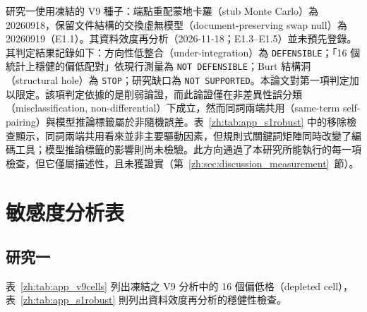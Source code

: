 研究一使用凍結的 V9 種子：端點重配蒙地卡羅（stub Monte Carlo）為 20260918，保留文件結構的交換虛無模型（document-preserving swap null）為 20260919（E1.1）。其資料效度再分析（2026-11-18；E1.3--E1.5）並未預先登錄。其判定結果記錄如下：方向性低整合（under-integration）為 \texttt{DEFENSIBLE}；「16 個統計上穩健的偏低配對」依現行測量為 \texttt{NOT DEFENSIBLE}；Burt 結構洞（structural hole）為 \texttt{STOP}；研究缺口為 \texttt{NOT SUPPORTED}。本論文對第一項判定加以限定。該項判定依據的是削弱論證，而此論證僅在非差異性誤分類（misclassification, non-differential）下成立，然而同詞兩端共用（same-term self-pairing）與模型推論標籤屬於非隨機誤差。表~\ref{zh:tab:app_s1robust} 中的移除檢查顯示，同詞兩端共用看來並非主要驅動因素，但規則式關鍵詞矩陣同時改變了編碼工具；模型推論標籤的影響則尚未檢驗。此方向通過了本研究所能執行的每一項檢查，但它僅屬描述性，且未獲證實（第~\ref{zh:sec:discussion_measurement}~節）。

\chapter{敏感度分析表}
\label{zh:app:sens}

\section{研究一}

表~\ref{zh:tab:app_v9cells} 列出凍結之 V9 分析中的 16 個偏低格（depleted cell），表~\ref{zh:tab:app_s1robust} 則列出資料效度再分析的穩健性檢查。

